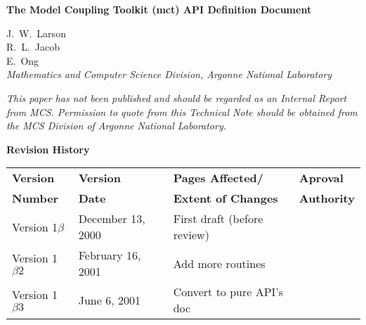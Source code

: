 \documentclass{article}
\begin{document}
\begin{sloppypar}
{\huge\bf
The Model Coupling Toolkit (mct) API Definition Document
\\ }                     %
\end{sloppypar}

\vspace{.3in}
             J.~W.~Larson\\
             R.~L.~Jacob\\
             E.~Ong\\
\vspace{.2in} {\em Mathematics and Computer Science Division,
Argonne National Laboratory\\}

\vfill

{\em This paper has not been published and should  be regarded as
an Internal Report from MCS. Permission to quote from this
Technical Note should be  obtained from the MCS Division of
Argonne National Laboratory.}

\vspace{0.4in}


\thispagestyle{empty}
\newpage




\newpage
\setcounter{page}{2}     %


\vspace*{\fill}

\centerline{\huge\bf Revision History}

\bigskip
{}

\begin{center}
\begin{tabular}{|l|l|l|l|}\hline
{\bf Version} & {\bf Version} & {\bf Pages Affected/}   & {\bf Aproval}\\
{\bf Number}  & {\bf Date}    & {\bf Extent of Changes} & {\bf Authority}\\
\hline
\hline 
Version 1$\beta$ & December 13, 2000      & First draft (before review) &
\\\hline
Version 1$\beta2$ & February 16, 2001      & Add more routines &
\\\hline
Version 1$\beta3$ & June 6, 2001      & Convert to pure API's doc &
\\\hline
\end{tabular}
\end{center}
\end{document}
